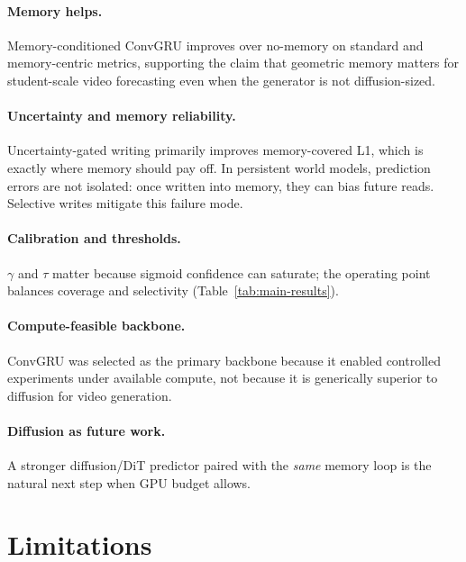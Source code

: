 \documentclass[11pt]{article}
\begin{document}
\paragraph{Memory helps.}
Memory-conditioned ConvGRU improves over no-memory on standard and memory-centric metrics, supporting the
claim that geometric memory matters for student-scale video forecasting even when the generator is not
diffusion-sized.

\paragraph{Uncertainty and memory reliability.}
Uncertainty-gated writing primarily improves memory-covered L1, which is exactly where memory should pay off.
In persistent world models, prediction errors are not isolated: once written into memory, they can bias future
reads. Selective writes mitigate this failure mode.

\paragraph{Calibration and thresholds.}
$\gamma$ and $\tau$ matter because sigmoid confidence can saturate; the operating point balances coverage and
selectivity (Table~\ref{tab:main-results}).

\paragraph{Compute-feasible backbone.}
ConvGRU was selected as the primary backbone because it enabled controlled experiments under available compute,
not because it is generically superior to diffusion for video generation.

\paragraph{Diffusion as future work.}
A stronger diffusion/DiT predictor paired with the \emph{same} memory loop is the natural next step when GPU
budget allows.

\section{Limitations}
\end{document}
